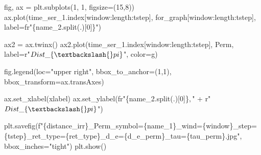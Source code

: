 \documentclass[
  letterpaper,
]{report}
\newenvironment{Shaded}{\begin{snugshade}}{\end{snugshade}}
\newcommand{\DecValTok}[1]{\textcolor[rgb]{0.68,0.00,0.00}{#1}}
\newcommand{\NormalTok}[1]{\textcolor[rgb]{0.00,0.23,0.31}{#1}}
\newcommand{\OperatorTok}[1]{\textcolor[rgb]{0.37,0.37,0.37}{#1}}
\newcommand{\SpecialCharTok}[1]{\textcolor[rgb]{0.37,0.37,0.37}{#1}}
\newcommand{\SpecialStringTok}[1]{\textcolor[rgb]{0.13,0.47,0.30}{#1}}
\newcommand{\StringTok}[1]{\textcolor[rgb]{0.13,0.47,0.30}{#1}}
\newcommand{\VerbatimStringTok}[1]{\textcolor[rgb]{0.13,0.47,0.30}{#1}}
\begin{document}
\begin{Shaded}
\begin{Highlighting}[]
\NormalTok{fig, ax }\OperatorTok{=}\NormalTok{ plt.subplots(}\DecValTok{1}\NormalTok{, }\DecValTok{1}\NormalTok{, figsize}\OperatorTok{=}\NormalTok{(}\DecValTok{15}\NormalTok{,}\DecValTok{8}\NormalTok{))}
\NormalTok{ax.plot(time\_ser\_1.index[window:length:tstep], for\_graph[window:length:tstep], label}\OperatorTok{=}\VerbatimStringTok{fr"}\SpecialCharTok{\{}\NormalTok{name\_2}\SpecialCharTok{.}\NormalTok{split(}\StringTok{\textquotesingle{}.\textquotesingle{}}\NormalTok{)[}\DecValTok{0}\NormalTok{]}\SpecialCharTok{\}}\VerbatimStringTok{"}\NormalTok{)}

\NormalTok{ax2 }\OperatorTok{=}\NormalTok{ ax.twinx()}
\NormalTok{ax2.plot(time\_ser\_1.index[window:length:tstep], Perm, label}\OperatorTok{=}\VerbatimStringTok{r"$ Dist\_\{\textbackslash{}pi\} $"}\NormalTok{, color}\OperatorTok{=}\StringTok{\textquotesingle{}g\textquotesingle{}}\NormalTok{)}

\NormalTok{fig.legend(loc}\OperatorTok{=}\StringTok{"upper right"}\NormalTok{, bbox\_to\_anchor}\OperatorTok{=}\NormalTok{(}\DecValTok{1}\NormalTok{,}\DecValTok{1}\NormalTok{), bbox\_transform}\OperatorTok{=}\NormalTok{ax.transAxes)}

\NormalTok{ax.set\_xlabel(xlabel)}
\NormalTok{ax.set\_ylabel(}\VerbatimStringTok{fr"}\SpecialCharTok{\{}\NormalTok{name\_2}\SpecialCharTok{.}\NormalTok{split(}\StringTok{\textquotesingle{}.\textquotesingle{}}\NormalTok{)[}\DecValTok{0}\NormalTok{]}\SpecialCharTok{\}}\VerbatimStringTok{$,$"} \OperatorTok{+} \VerbatimStringTok{r"$Dist\_\{\textbackslash{}pi\}$"}\NormalTok{)}

\NormalTok{plt.savefig(}\SpecialStringTok{f"}\SpecialCharTok{\{}\NormalTok{distance\_irr}\SpecialCharTok{\}}\SpecialStringTok{\_Perm\_symbol=}\SpecialCharTok{\{}\NormalTok{name\_1}\SpecialCharTok{\}}\SpecialStringTok{\_wind=}\SpecialCharTok{\{}\NormalTok{window}\SpecialCharTok{\}}\SpecialStringTok{\_step=}\SpecialCharTok{\{}\NormalTok{tstep}\SpecialCharTok{\}}\SpecialStringTok{\_ret\_type=}\SpecialCharTok{\{}\NormalTok{ret\_type}\SpecialCharTok{\}}\SpecialStringTok{\_d\_e=}\SpecialCharTok{\{}\NormalTok{d\_e\_perm}\SpecialCharTok{\}}\SpecialStringTok{\_tau=}\SpecialCharTok{\{}\NormalTok{tau\_perm}\SpecialCharTok{\}}\SpecialStringTok{.jpg"}\NormalTok{, bbox\_inches}\OperatorTok{=}\StringTok{"tight"}\NormalTok{)}
\NormalTok{plt.show()}
\end{Highlighting}
\end{Shaded}
\end{document}
